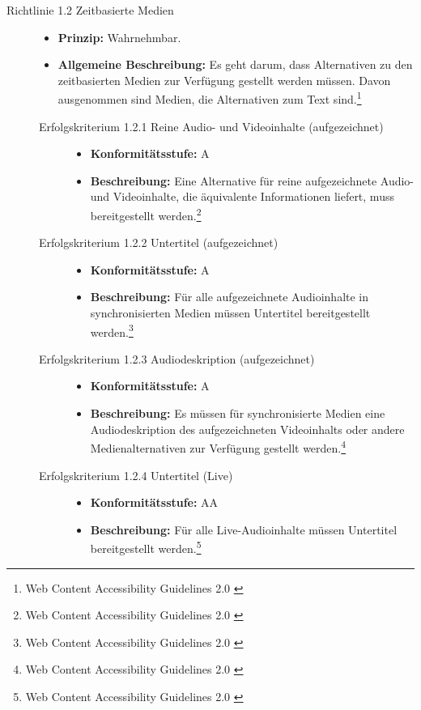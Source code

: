 \begin{description}
	\item[Richtlinie 1.2 Zeitbasierte Medien]\hfill
	\begin{itemize}
		\item \textbf{Prinzip:} Wahrnehmbar.
		\item \textbf{Allgemeine Beschreibung:} Es geht darum, dass Alternativen zu den zeitbasierten Medien zur Verfügung gestellt werden müssen. Davon ausgenommen sind 
		Medien, die Alternativen zum Text sind.\footnote{Web Content Accessibility Guidelines 2.0 \cite{WCAG2.0}}
	\end{itemize}
	
	\begin{description}
		\item[Erfolgskriterium 1.2.1 Reine Audio- und Videoinhalte (aufgezeichnet)]\hfill
		\begin{itemize}
			\item \textbf{Konformitätsstufe:} A
			\item \textbf{Beschreibung:} Eine Alternative für reine aufgezeichnete Audio- und Videoinhalte, die äquivalente Informationen 
			liefert, muss bereitgestellt werden.\footnote{Web Content Accessibility Guidelines 2.0 \cite{WCAG2.0}}
		\end{itemize}
			
		\item[Erfolgskriterium 1.2.2 Untertitel (aufgezeichnet)]\hfill
		\begin{itemize}
			\item \textbf{Konformitätsstufe:} A
			\item \textbf{Beschreibung:} Für alle aufgezeichnete Audioinhalte in synchronisierten Medien müssen Untertitel bereitgestellt 
			werden.\footnote{Web Content Accessibility Guidelines 2.0 \cite{WCAG2.0}}
		\end{itemize}
			
		\item[Erfolgskriterium 1.2.3 Audiodeskription (aufgezeichnet)]\hfill
		\begin{itemize}
			\item \textbf{Konformitätsstufe:} A
			\item \textbf{Beschreibung:} Es müssen für synchronisierte Medien eine Audiodeskription des aufgezeichneten Videoinhalts oder andere 
			Medienalternativen zur Verfügung gestellt werden.\footnote{Web Content Accessibility Guidelines 2.0 \cite{WCAG2.0}}
		\end{itemize}
			
		\item[Erfolgskriterium 1.2.4 Untertitel (Live)]\hfill
		\begin{itemize}
			\item \textbf{Konformitätsstufe:} AA
			\item \textbf{Beschreibung:} Für alle Live-Audioinhalte müssen Untertitel bereitgestellt werden.\footnote{Web Content Accessibility Guidelines 2.0 \cite{WCAG2.0}}
		\end{itemize}
			

\end{description}
\end{description}

